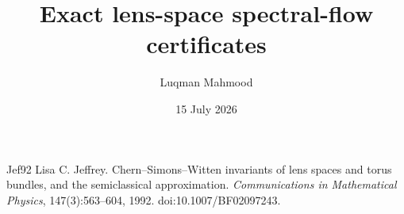 \documentclass[11pt]{article}
\title{Exact lens-space spectral-flow certificates}
\author{Luqman Mahmood}
\date{15 July 2026}
\begin{document}
\maketitle


\begin{thebibliography}{Jef92}
Lisa C. Jeffrey.
\newblock Chern--Simons--Witten invariants of lens spaces and torus bundles,
  and the semiclassical approximation.
\newblock \emph{Communications in Mathematical Physics}, 147(3):563--604,
  1992.  doi:10.1007/BF02097243.
\end{thebibliography}
\end{document}
